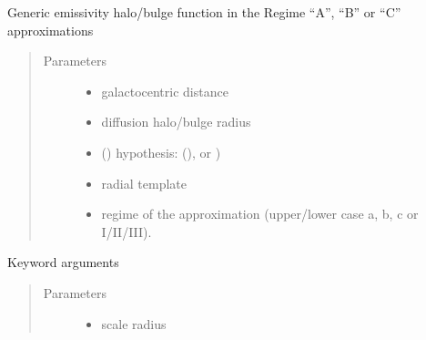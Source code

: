 \documentclass[letterpaper,10pt,english]{sphinxmanual}
\begin{document}
\begin{fulllineitems}
\label{\detokenize{diffsph.profiles:diffsph.profiles.hfactors.H_emissivity}}
\sphinxAtStartPar
Generic emissivity halo/bulge function in the Regime “A”, “B” or “C” approximations
\begin{quote}\begin{description}
\item[{Parameters}] \leavevmode\begin{itemize}
\item {} 
\sphinxAtStartPar
{} \textendash{} galactocentric distance

\item {} 
\sphinxAtStartPar
{} \textendash{} diffusion halo/bulge radius

\item {} 
\sphinxAtStartPar
{} () \textendash{} hypothesis:  (),  or )

\item {} 
\sphinxAtStartPar
{} \textendash{} radial template

\item {} 
\sphinxAtStartPar
{} \textendash{} regime of the approximation (upper/lower case a, b, c or I/II/III).

\end{itemize}

\end{description}\end{quote}

\sphinxAtStartPar
Keyword arguments
\begin{quote}\begin{description}
\item[{Parameters}] \leavevmode\begin{itemize}
\item {} 
\sphinxAtStartPar
{} \textendash{} scale radius


\end{itemize}
\end{description}
\end{quote}
\end{fulllineitems}
\end{document}
